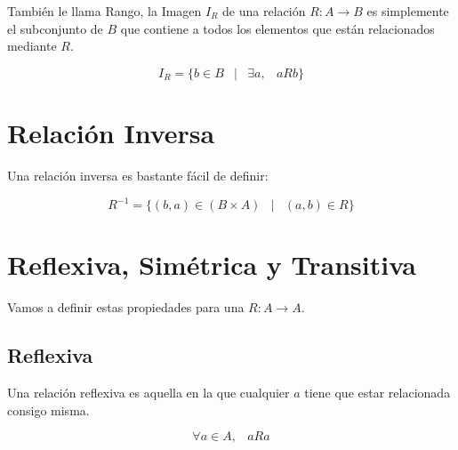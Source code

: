 \documentclass[12pt]{report}                                    %
\DeclareMathOperator \Space {\quad}                             %
\DeclareMathOperator \MiniSpace {\;}                            %
\newcommand \Such {\MiniSpace|\MiniSpace}                       %
\begin{document}
            También le llama Rango, la Imagen $I_R$ de una relación $R : A \to B$
            es simplemente el subconjunto de $B$ que contiene a todos los elementos que están
            relacionados mediante $R$.

            \begin{equation}
                I_R = \{ b \in B \Such \exists a, \MiniSpace aRb \}
            \end{equation}




    \clearpage
    \section{Relación Inversa}

        Una relación inversa es bastante fácil de definir:

        \begin{equation}
            R^{-1} = \{ (b, a) \in (B \times A) \Such (a, b) \in R \}
        \end{equation}





    \clearpage
    \section{Reflexiva, Simétrica y Transitiva}

        Vamos a definir estas propiedades para una $R: A \to A$.
            
        \subsection{Reflexiva}

            Una relación reflexiva es aquella en la que cualquier $a$ tiene que estar relacionada
            consigo misma.

            \begin{equation}
                \forall a \in A, \MiniSpace aRa
            \end{equation}
\end{document}
